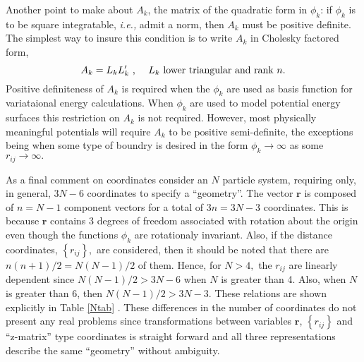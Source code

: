 \documentclass[12pt,thmsa]{article}
\begin{document}
Another point to make about $A_k$, the matrix of the quadratic form in $\phi
_k$: if $\phi _k$ is to be square integratable, \textit{i.e.,} admit a norm,
then $A_k$ must be positive definite. The simplest way to insure this
condition is to write $A_k$ in Cholesky factored form, 
\begin{equation}
A_k=L_kL_k^{\prime }\text{ ,\thinspace \thinspace \thinspace \thinspace
\thinspace \thinspace \thinspace \thinspace }L_k\text{ lower triangular and
rank }n.
\end{equation}
Positive definiteness of $A_k$ is required when the $\phi _k$ are used as
basis function for variataional energy calculations. When $\phi _k$ are used
to model potential energy surfaces this restriction on $A_k$ is not
required. However, most physically meaningful potentials will require $A_k$
to be positive semi-definite, the exceptions being when some type of boundry
is desired in the form $\phi _k\rightarrow \infty $ as some $%
r_{ij}\rightarrow \infty .$

As a final comment on coordinates consider an $N$ particle system, requiring
only, in general,  $3N-6$ coordinates to specify a ``geometry''. The vector $%
\mathbf{r}$ is composed of $n=N-1$ component vectors for a total of $3n=3N-3$
coordinates. This is because $\mathbf{r}$ contains 3 degrees of freedom
associated with rotation about the origin even though the functions $\phi _k$
are rotationaly invariant. Also, if the distance coordinates, $\left\{
r_{ij}\right\} ,$ are considered, then it should be noted that there are $%
n\left( n+1\right) /2=N\left( N-1\right) /2$ of them. Hence, for $N>4,$ the $%
r_{ij}$ are linearly dependent since $N\left( N-1\right) /2>3N-6$ when $N$
is greater than 4. Also, when $N$ is greater than 6, then $N\left(
N-1\right) /2>3N-3.$ These relations are shown explicitly in Table \ref{Ntab}%
. These differences in the number of coordinates do not present any real
problems since transformations between variables $\mathbf{r}$, $\left\{
r_{ij}\right\} $ and ``z-matrix'' type coordinates is straight forward and
all three representations describe the same ``geometry'' without ambiguity.
\end{document}
